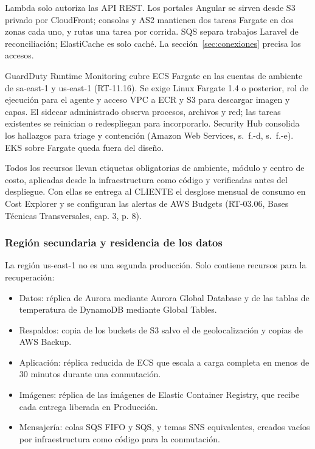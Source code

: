 Lambda solo autoriza las API REST. Los portales Angular se sirven desde S3 privado por CloudFront; consolas y AS2 mantienen dos tareas Fargate en dos zonas cada uno, y rutas una tarea por corrida. SQS separa trabajos Laravel de reconciliación; ElastiCache es solo caché. La sección~\ref{sec:conexiones} precisa los accesos.

GuardDuty Runtime Monitoring cubre ECS Fargate en las cuentas de ambiente de sa-east-1 y us-east-1 (RT-11.16). Se exige Linux Fargate 1.4 o posterior, rol de ejecución para el agente y acceso VPC a ECR y S3 para descargar imagen y capas. El sidecar administrado observa procesos, archivos y red; las tareas existentes se reinician o redespliegan para incorporarlo. Security Hub consolida los hallazgos para triage y contención (Amazon Web Services, s.~f.-d, s.~f.-e). EKS sobre Fargate queda fuera del diseño.

Todos los recursos llevan etiquetas obligatorias de ambiente, módulo y centro de costo, aplicadas desde la infraestructura como código y verificadas antes del despliegue. Con ellas se entrega al CLIENTE el desglose mensual de consumo en Cost Explorer y se configuran las alertas de AWS Budgets (RT-03.06, Bases Técnicas Transversales, cap. 3, p. 8).

\subsubsection{Región secundaria y residencia de los datos}

La región us-east-1 no es una segunda producción. Solo contiene recursos para la recuperación:

\begin{itemize}
  \item Datos: réplica de Aurora mediante Aurora Global Database y de las tablas de temperatura de DynamoDB mediante Global Tables.
  \item Respaldos: copia de los buckets de S3 salvo el de geolocalización y copias de AWS Backup.
  \item Aplicación: réplica reducida de ECS que escala a carga completa en menos de 30 minutos durante una conmutación.
  \item Imágenes: réplica de las imágenes de Elastic Container Registry, que recibe cada entrega liberada en Producción.
  \item Mensajería: colas SQS FIFO y SQS, y temas SNS equivalentes, creados vacíos por infraestructura como código para la conmutación.
\end{itemize}


